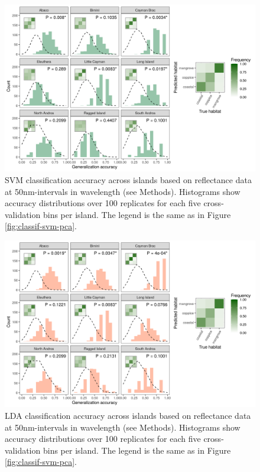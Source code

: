 \begin{figure}[H]
	\centering
	\includegraphics[width=\textwidth]{suppfigures/classif_svm_refl.png}
	\caption{SVM classification accuracy across islands based on reflectance data at 50nm-intervals in wavelength (see Methods). Histograms show accuracy distributions over 100 replicates for each five cross-validation bins per island. The legend is the same as in Figure \ref{fig:classif-svm-pca}.}
	\label{supfig:classif-svm-refl}
\end{figure}

\begin{figure}[H]
	\centering
	\includegraphics[width=\textwidth]{suppfigures/classif_lda_refl.png}
	\caption{LDA classification accuracy across islands based on reflectance data at 50nm-intervals in wavelength (see Methods). Histograms show accuracy distributions over 100 replicates for each five cross-validation bins per island. The legend is the same as in Figure \ref{fig:classif-svm-pca}.}
	\label{supfig:classif-lda-refl}
\end{figure}

